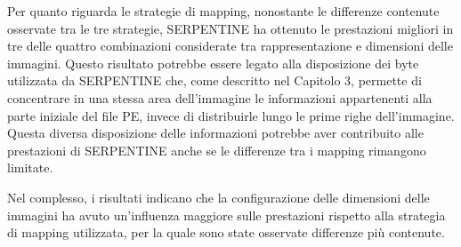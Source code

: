 Per quanto riguarda le strategie di mapping, nonostante le differenze
contenute osservate tra le tre strategie, SERPENTINE ha ottenuto le
prestazioni migliori in tre delle quattro combinazioni considerate
tra rappresentazione e dimensioni delle immagini. Questo risultato
potrebbe essere legato alla disposizione dei byte utilizzata da
SERPENTINE che, come descritto nel Capitolo 3, permette di concentrare
in una stessa area dell'immagine le informazioni appartenenti alla
parte iniziale del file PE, invece di
distribuirle lungo le prime righe dell'immagine.
Questa diversa disposizione delle informazioni
potrebbe aver contribuito alle prestazioni di SERPENTINE anche se le
differenze tra i mapping rimangono limitate.

Nel complesso, i risultati indicano che la configurazione delle
dimensioni delle immagini ha avuto un'influenza maggiore sulle
prestazioni rispetto alla strategia di mapping utilizzata, per la
quale sono state osservate differenze più contenute.